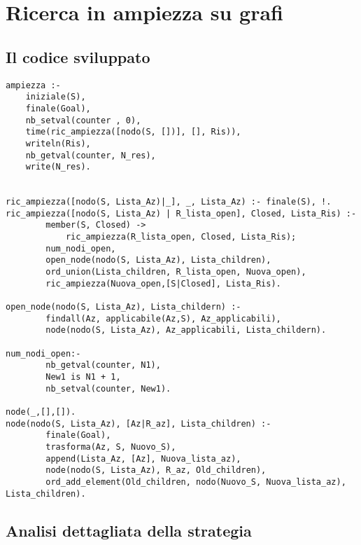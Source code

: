 \section{Ricerca in ampiezza su grafi}

\subsection{Il codice sviluppato}

\begin{lstlisting}
ampiezza :-
    iniziale(S),
    finale(Goal),
    nb_setval(counter , 0),
    time(ric_ampiezza([nodo(S, [])], [], Ris)),
    writeln(Ris),
    nb_getval(counter, N_res),
    write(N_res).


ric_ampiezza([nodo(S, Lista_Az)|_], _, Lista_Az) :- finale(S), !.
ric_ampiezza([nodo(S, Lista_Az) | R_lista_open], Closed, Lista_Ris) :-
        member(S, Closed) ->
        	ric_ampiezza(R_lista_open, Closed, Lista_Ris);
        num_nodi_open,
        open_node(nodo(S, Lista_Az), Lista_children),
        ord_union(Lista_children, R_lista_open, Nuova_open),
        ric_ampiezza(Nuova_open,[S|Closed], Lista_Ris).

open_node(nodo(S, Lista_Az), Lista_childern) :-
        findall(Az, applicabile(Az,S), Az_applicabili),
        node(nodo(S, Lista_Az), Az_applicabili, Lista_childern).

num_nodi_open:-
        nb_getval(counter, N1),
        New1 is N1 + 1,
        nb_setval(counter, New1).

node(_,[],[]).
node(nodo(S, Lista_Az), [Az|R_az], Lista_children) :-
        finale(Goal),
        trasforma(Az, S, Nuovo_S),
        append(Lista_Az, [Az], Nuova_lista_az),
        node(nodo(S, Lista_Az), R_az, Old_children),
        ord_add_element(Old_children, nodo(Nuovo_S, Nuova_lista_az), Lista_children).
\end{lstlisting}

\subsection{Analisi dettagliata della strategia}

